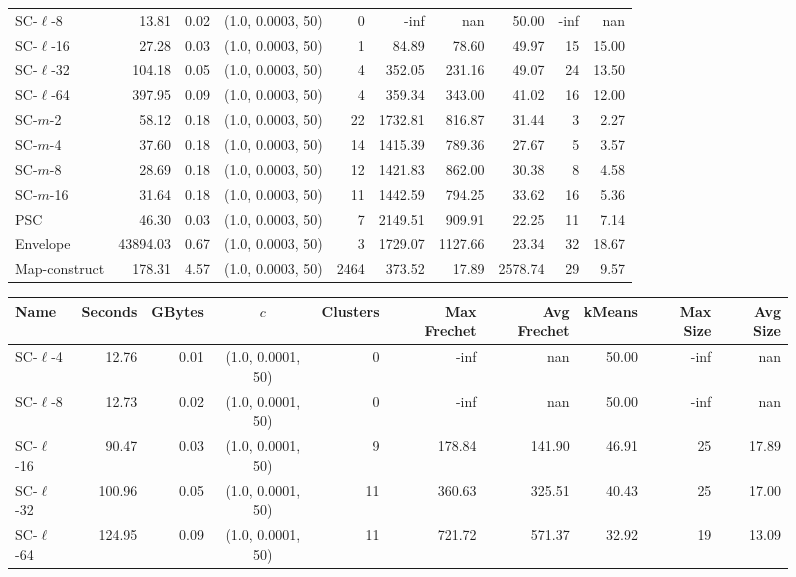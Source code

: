 \begin{figure}
\begin{center}
\begin{minipage}{\textwidth}
{\begin{tabular}{@{}lrrcrrrrrr@{}}
        SC-$\ell$-8 & 13.81 & 0.02 & (1.0, 0.0003, 50) & 0 & -inf & nan & 50.00 & -inf & nan\\
        SC-$\ell$-16 & 27.28 & 0.03 & (1.0, 0.0003, 50) & 1 & 84.89 & 78.60 & 49.97 & 15 & 15.00\\
        SC-$\ell$-32 & 104.18 & 0.05 & (1.0, 0.0003, 50) & 4 & 352.05 & 231.16 & 49.07 & 24 & 13.50\\
        SC-$\ell$-64 & 397.95 & 0.09 & (1.0, 0.0003, 50) & 4 & 359.34 & 343.00 & 41.02 & 16 & 12.00\\
        SC-$m$-2 & 58.12 & 0.18 & (1.0, 0.0003, 50) & 22 & 1732.81 & 816.87 & 31.44 & 3 & 2.27\\
        SC-$m$-4 & 37.60 & 0.18 & (1.0, 0.0003, 50) & 14 & 1415.39 & 789.36 & 27.67 & 5 & 3.57\\
        SC-$m$-8 & 28.69 & 0.18 & (1.0, 0.0003, 50) & 12 & 1421.83 & 862.00 & 30.38 & 8 & 4.58\\
        SC-$m$-16 & 31.64 & 0.18 & (1.0, 0.0003, 50) & 11 & 1442.59 & 794.25 & 33.62 & 16 & 5.36\\
        PSC & 46.30 & 0.03 & (1.0, 0.0003, 50) & 7 & 2149.51 & 909.91 & 22.25 & 11 & 7.14\\
        Envelope & 43894.03 & 0.67 & (1.0, 0.0003, 50) & 3 & 1729.07 & 1127.66 & 23.34 & 32 & 18.67\\
        Map-construct & 178.31 & 4.57 & (1.0, 0.0003, 50) & 2464 & 373.52 & 17.89 & 2578.74 & 29 & 9.57\\
        \bottomrule
    \end{tabular}
    }
    {
    \begin{tabular}{@{}lrrcrrrrrr@{}}
        \toprule
        Name & Seconds & GBytes & $c$ & Clusters & Max Frechet & Avg Frechet & kMeans & Max Size & Avg Size\\
        \midrule
        SC-$\ell$-4 & 12.76 & 0.01 & (1.0, 0.0001, 50) & 0 & -inf & nan & 50.00 & -inf & nan\\
        SC-$\ell$-8 & 12.73 & 0.02 & (1.0, 0.0001, 50) & 0 & -inf & nan & 50.00 & -inf & nan\\
        SC-$\ell$-16 & 90.47 & 0.03 & (1.0, 0.0001, 50) & 9 & 178.84 & 141.90 & 46.91 & 25 & 17.89\\
        SC-$\ell$-32 & 100.96 & 0.05 & (1.0, 0.0001, 50) & 11 & 360.63 & 325.51 & 40.43 & 25 & 17.00\\
        SC-$\ell$-64 & 124.95 & 0.09 & (1.0, 0.0001, 50) & 11 & 721.72 & 571.37 & 32.92 & 19 & 13.09\\

\end{tabular}}
\end{minipage}
\end{center}
\end{figure}
